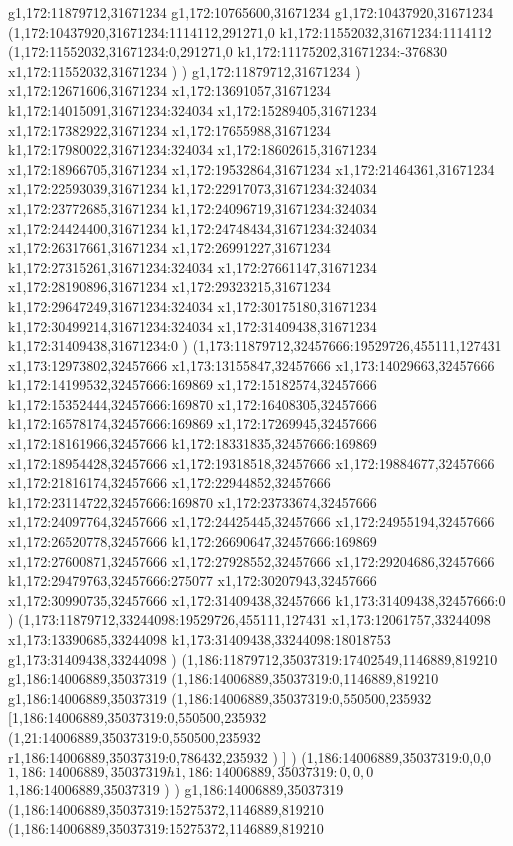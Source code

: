 {g1,172:11879712,31671234
g1,172:10765600,31671234
g1,172:10437920,31671234
(1,172:10437920,31671234:1114112,291271,0
k1,172:11552032,31671234:1114112
(1,172:11552032,31671234:0,291271,0
k1,172:11175202,31671234:-376830
x1,172:11552032,31671234
)
)
g1,172:11879712,31671234
)
x1,172:12671606,31671234
x1,172:13691057,31671234
k1,172:14015091,31671234:324034
x1,172:15289405,31671234
x1,172:17382922,31671234
x1,172:17655988,31671234
k1,172:17980022,31671234:324034
x1,172:18602615,31671234
x1,172:18966705,31671234
x1,172:19532864,31671234
x1,172:21464361,31671234
x1,172:22593039,31671234
k1,172:22917073,31671234:324034
x1,172:23772685,31671234
k1,172:24096719,31671234:324034
x1,172:24424400,31671234
k1,172:24748434,31671234:324034
x1,172:26317661,31671234
x1,172:26991227,31671234
k1,172:27315261,31671234:324034
x1,172:27661147,31671234
x1,172:28190896,31671234
x1,172:29323215,31671234
k1,172:29647249,31671234:324034
x1,172:30175180,31671234
k1,172:30499214,31671234:324034
x1,172:31409438,31671234
k1,172:31409438,31671234:0
)
(1,173:11879712,32457666:19529726,455111,127431
x1,173:12973802,32457666
x1,173:13155847,32457666
x1,173:14029663,32457666
k1,172:14199532,32457666:169869
x1,172:15182574,32457666
k1,172:15352444,32457666:169870
x1,172:16408305,32457666
k1,172:16578174,32457666:169869
x1,172:17269945,32457666
x1,172:18161966,32457666
k1,172:18331835,32457666:169869
x1,172:18954428,32457666
x1,172:19318518,32457666
x1,172:19884677,32457666
x1,172:21816174,32457666
x1,172:22944852,32457666
k1,172:23114722,32457666:169870
x1,172:23733674,32457666
x1,172:24097764,32457666
x1,172:24425445,32457666
x1,172:24955194,32457666
x1,172:26520778,32457666
k1,172:26690647,32457666:169869
x1,172:27600871,32457666
x1,172:27928552,32457666
x1,172:29204686,32457666
k1,172:29479763,32457666:275077
x1,172:30207943,32457666
x1,172:30990735,32457666
x1,172:31409438,32457666
k1,173:31409438,32457666:0
)
(1,173:11879712,33244098:19529726,455111,127431
x1,173:12061757,33244098
x1,173:13390685,33244098
k1,173:31409438,33244098:18018753
g1,173:31409438,33244098
)
(1,186:11879712,35037319:17402549,1146889,819210
g1,186:14006889,35037319
(1,186:14006889,35037319:0,1146889,819210
g1,186:14006889,35037319
(1,186:14006889,35037319:0,550500,235932
[1,186:14006889,35037319:0,550500,235932
(1,21:14006889,35037319:0,550500,235932
r1,186:14006889,35037319:0,786432,235932
)
]
)
(1,186:14006889,35037319:0,0,0
$1,186:14006889,35037319
h1,186:14006889,35037319:0,0,0
$1,186:14006889,35037319
)
)
g1,186:14006889,35037319
(1,186:14006889,35037319:15275372,1146889,819210
(1,186:14006889,35037319:15275372,1146889,819210
}
